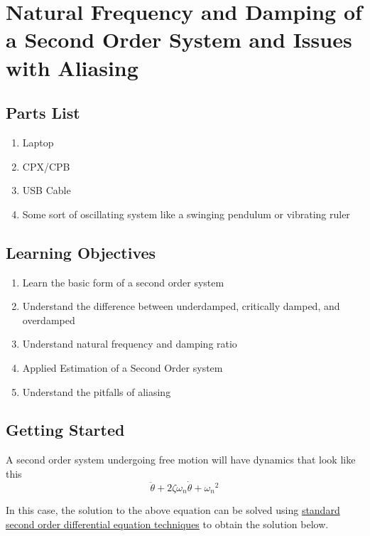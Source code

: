 \newpage

\section{Natural Frequency and Damping of a Second Order System and Issues with Aliasing}
\label{s:pendulum}

\subsection{Parts List}

\begin{enumerate}[itemsep=-5pt]
\item Laptop
\item CPX/CPB
\item USB Cable
\item Some sort of oscillating system like a swinging pendulum or vibrating ruler
\end{enumerate}

\subsection{Learning Objectives}
\begin{enumerate}[itemsep=-5pt]
\item Learn the basic form of a second order system
\item Understand the difference between underdamped, critically damped, and overdamped
\item Understand natural frequency and damping ratio
\item Applied Estimation of a Second Order system
\item Understand the pitfalls of aliasing
\end{enumerate}

\subsection{Getting Started}
A second order system undergoing free motion will have dynamics that look like this
\begin{equation}
\ddot{\theta} + 2\zeta \omega_n \dot{\theta} + {\omega_n}^2
\end{equation}

In this case, the solution to the above equation can be solved using \href{https://www.youtube.com/watch?v=VOv2HI3i7oo}{standard second order differential equation techniques} to obtain the solution below.

